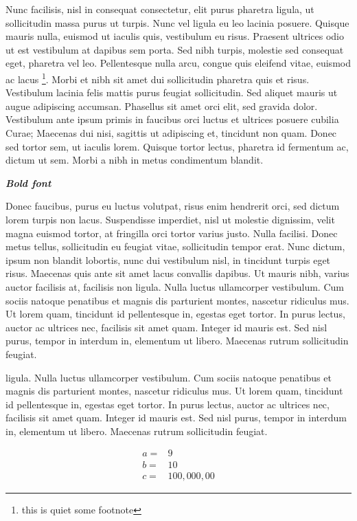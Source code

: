 Nunc facilisis, nisl in consequat consectetur, elit purus pharetra
ligula, ut sollicitudin massa purus ut turpis. Nunc vel ligula eu leo
lacinia posuere. Quisque mauris nulla, euismod ut iaculis quis,
vestibulum eu risus. Praesent ultrices odio ut est vestibulum at dapibus
sem porta. Sed nibh turpis, molestie sed consequat eget, pharetra vel
leo. Pellentesque nulla arcu, congue quis eleifend vitae, euismod ac
lacus \footnote{this is quiet some footnote}. Morbi et nibh sit amet dui
sollicitudin pharetra quis et risus. Vestibulum lacinia felis mattis
purus feugiat sollicitudin. Sed aliquet mauris ut augue adipiscing
accumsan. Phasellus sit amet orci elit, sed gravida dolor. Vestibulum
ante ipsum primis in faucibus orci luctus et ultrices posuere cubilia
Curae; Maecenas dui nisi, sagittis ut adipiscing et, tincidunt non quam.
Donec sed tortor sem, ut iaculis lorem. Quisque tortor lectus, pharetra
id fermentum ac, dictum ut sem. Morbi a nibh in metus condimentum
blandit.

\textbf{\emph{Bold font}}

Donec faucibus, purus eu luctus volutpat, risus enim hendrerit orci, sed
dictum lorem turpis non lacus. Suspendisse imperdiet, nisl ut molestie
dignissim, velit magna euismod tortor, at fringilla orci tortor varius
justo. Nulla facilisi. Donec metus tellus, sollicitudin eu feugiat
vitae, sollicitudin tempor erat. Nunc dictum, ipsum non blandit
lobortis, nunc dui vestibulum nisl, in tincidunt turpis eget risus.
Maecenas quis ante sit amet lacus convallis dapibus. Ut mauris nibh,
varius auctor facilisis at, facilisis non ligula. Nulla luctus
ullamcorper vestibulum. Cum sociis natoque penatibus et magnis dis
parturient montes, nascetur ridiculus mus. Ut lorem quam, tincidunt id
pellentesque in, egestas eget tortor. In purus lectus, auctor ac
ultrices nec, facilisis sit amet quam. Integer id mauris est. Sed nisl
purus, tempor in interdum in, elementum ut libero. Maecenas rutrum
sollicitudin feugiat.

ligula. Nulla luctus ullamcorper vestibulum. Cum sociis natoque
penatibus et magnis dis parturient montes, nascetur ridiculus mus. Ut
lorem quam, tincidunt id pellentesque in, egestas eget tortor. In purus
lectus, auctor ac ultrices nec, facilisis sit amet quam. Integer id
mauris est. Sed nisl purus, tempor in interdum in, elementum ut libero.
Maecenas rutrum sollicitudin feugiat.

\begin{align*}
a =& 9 \\
b =& 10 \\
c =& 100,000,00
\end{align*}

